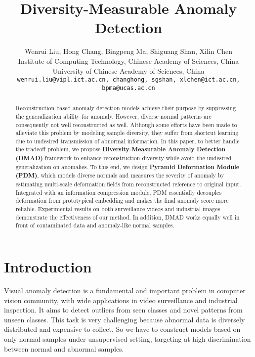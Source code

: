 \documentclass[10pt,twocolumn,letterpaper]{article}
\begin{document}
\title{Diversity-Measurable Anomaly Detection}

\author{Wenrui Liu, Hong Chang, Bingpeng Ma, Shiguang Shan, Xilin Chen\\
Institute of Computing Technology, Chinese Academy of Sciences, China\\
University of Chinese Academy of Sciences, China\\
{\tt\small wenrui.liu@vipl.ict.ac.cn, changhong, sgshan, xlchen@ict.ac.cn, bpma@ucas.ac.cn}
}
\maketitle

\begin{abstract}


    Reconstruction-based anomaly detection models achieve their purpose by suppressing the generalization ability for anomaly. However, diverse normal patterns are consequently not well reconstructed as well. Although some efforts have been made to alleviate this problem by modeling sample diversity, they suffer from shortcut learning due to undesired transmission of abnormal information. In this paper, to better handle the tradeoff problem, we propose \textbf{Diversity-Measurable Anomaly Detection (DMAD)} framework to enhance reconstruction diversity while avoid the undesired generalization on anomalies. To this end, we design \textbf{Pyramid Deformation Module (PDM)}, which models diverse normals and measures the severity of anomaly by estimating multi-scale deformation fields from reconstructed reference to original input. Integrated with an information compression module, PDM essentially decouples deformation from prototypical embedding and makes the final anomaly score more reliable. Experimental results on both surveillance videos and industrial images demonstrate the effectiveness of our method. In addition, DMAD works equally well in front of contaminated data and anomaly-like normal samples.
\end{abstract}

\section{Introduction}
\label{sec:1}
Visual anomaly detection is a fundamental and important problem in computer vision community, with wide applications in video surveillance and industrial inspection. It aims to detect outliers from seen classes and novel patterns from unseen classes. This task is very challenging because abnormal data is diversely distributed and expensive to collect. So we have to construct models based on only normal samples under unsupervised setting, targeting at high discrimination between normal and abnormal samples.
\end{document}
